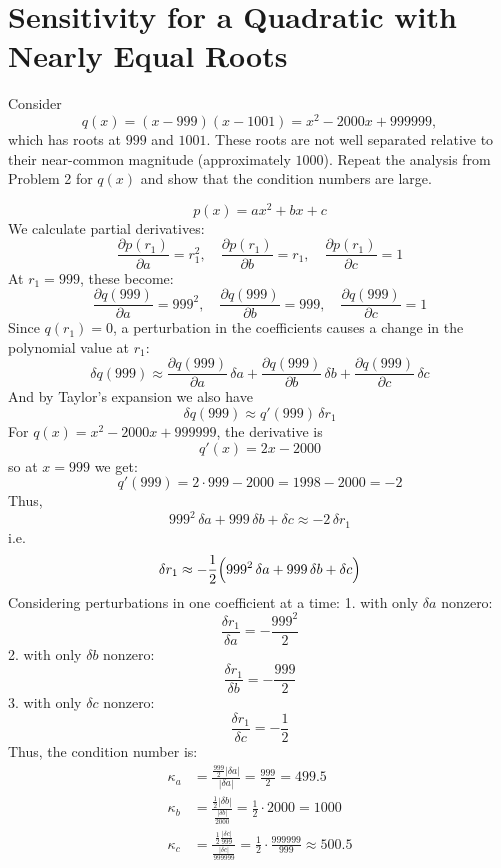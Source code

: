\documentclass[lang=cn,11pt]{elegantbook}
\begin{document}
\section{Sensitivity for a Quadratic with Nearly Equal Roots}
Consider
\[
q(x)=(x-999)(x-1001)=x^2-2000x+999999,
\]
which has roots at \(999\) and \(1001\). These roots are not well separated relative to their near-common magnitude (approximately \(1000\)). Repeat the analysis from Problem 2 for \(q(x)\) and show that the condition numbers are large.
\begin{solution}\[
p(x)=ax^2+bx+c
\]
We calculate partial derivatives:
\[
\frac{\partial p(r_1)}{\partial a} = r_1^2,\quad \frac{\partial p(r_1)}{\partial b} = r_1,\quad \frac{\partial p(r_1)}{\partial c} = 1
\]
At \(r_1=999\), these become:
\[
\frac{\partial q(999)}{\partial a} = 999^2,\quad \frac{\partial q(999)}{\partial b} = 999,\quad \frac{\partial q(999)}{\partial c} = 1
\]
Since \(q(r_1)=0\), a perturbation in the coefficients causes a change in the polynomial value at \(r_1\):
\[
\delta q(999) \approx \frac{\partial q(999)}{\partial a}\,\delta a + \frac{\partial q(999)}{\partial b}\,\delta b + \frac{\partial q(999)}{\partial c}\,\delta c
\]
And by Taylor’s expansion we also have
\[
\delta q(999) \approx q'(999)\,\delta r_1
\]
For \(q(x)=x^2-2000x+999999\), the derivative is
\[ q'(x)=2x-2000
\]
so at \(x=999\) we get:
\[
q'(999)=2\cdot 999 - 2000 = 1998 - 2000 = -2
\]
Thus,
\[
999^2\,\delta a + 999\,\delta b + \delta c \approx -2\,\delta r_1
\]
i.e.
\[
\delta r_1 \approx -\frac{1}{2}\Bigl(999^2\,\delta a + 999\,\delta b + \delta c\Bigr)
\]
Considering perturbations in one coefficient at a time:
1. with only \(\delta a\) nonzero:  \[
  \frac{\delta r_1}{\delta a} = -\frac{999^2}{2}
  \]
2. with only \(\delta b\) nonzero:  \[
  \frac{\delta r_1}{\delta b} = -\frac{999}{2}
  \]
3. with only \(\delta c\) nonzero: \[
  \frac{\delta r_1}{\delta c} = -\frac{1}{2}
  \]
Thus, the condition number is: 
\begin{align*}
    \kappa_a &= \frac{\frac{999}{2}|\delta a|}{|\delta a|} = \frac{999}{2} = 499.5\\
    \kappa_b &= \frac{\frac{1}{2}|\delta b|}{\frac{|\delta b|}{2000}} = \frac{1}{2}\cdot 2000 = 1000\\
    \kappa_c &= \frac{\frac{1}{2}\frac{|\delta c|}{999}}{\frac{|\delta c|}{999999}} = \frac{1}{2}\cdot\frac{999999}{999} \approx 500.5
\end{align*}
\end{solution}
\end{document}
